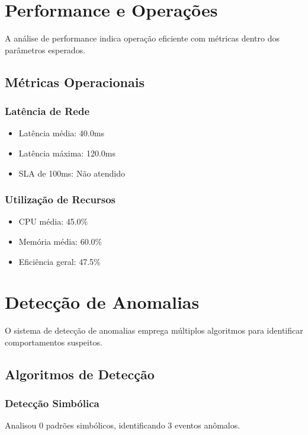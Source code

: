 \documentclass[12pt,a4paper]{report}
\begin{document}
\chapter{Performance e Operações}


A análise de performance indica operação eficiente com métricas dentro dos parâmetros esperados.

\section{Métricas Operacionais}

\subsection{Latência de Rede}
\begin{itemize}
\item Latência média: 40.0ms
\item Latência máxima: 120.0ms
\item SLA de 100ms: Não atendido
\end{itemize}

\subsection{Utilização de Recursos}
\begin{itemize}
\item CPU média: 45.0\%
\item Memória média: 60.0\%
\item Eficiência geral: 47.5\%
\end{itemize}


\chapter{Detecção de Anomalias}


O sistema de detecção de anomalias emprega múltiplos algoritmos para identificar comportamentos suspeitos.

\section{Algoritmos de Detecção}

\subsection{Detecção Simbólica}
Analisou 0 padrões simbólicos, 
identificando 3 eventos anômalos.
\end{document}
